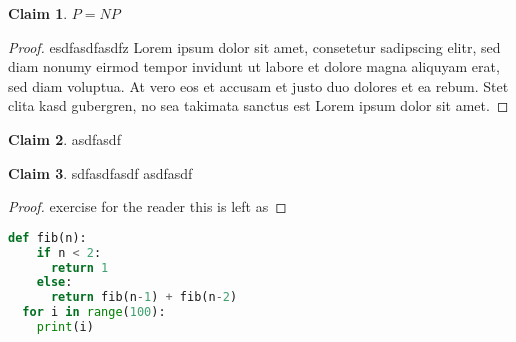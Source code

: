 \documentclass{article}[11pt]
\theoremstyle{definition}
\newtheorem{protoclaim}{Claim}[section]
\newenvironment{clm}
{\begin{tcolorbox}[colback=green!15!white,colframe=green!35!black]\begin{protoclaim}}
{\end{protoclaim}\end{tcolorbox}}
\theoremstyle{definition}
\begin{document}
\begin{clm}
 $P=NP$
\end{clm}
\begin{proof}
esdfasdfasdfz  
Lorem ipsum dolor sit amet, consetetur sadipscing elitr, sed diam
nonumy eirmod tempor invidunt ut labore et dolore magna aliquyam
erat, sed diam voluptua. At vero eos et accusam et justo duo
dolores et ea rebum. Stet clita kasd gubergren, no sea takimata
sanctus est Lorem ipsum dolor sit amet.
\end{proof}

\begin{clm}
  asdfasdf
\end{clm}

\begin{clm}
 sdfasdfasdf asdfasdf
\end{clm}
\begin{proof}
  exercise for the reader this is left as
\end{proof}

\begin{lstlisting}[language=python]
  def fib(n):
    if n < 2:
      return 1
    else:
      return fib(n-1) + fib(n-2)
  for i in range(100):
    print(i)
\end{lstlisting}
\end{document}

